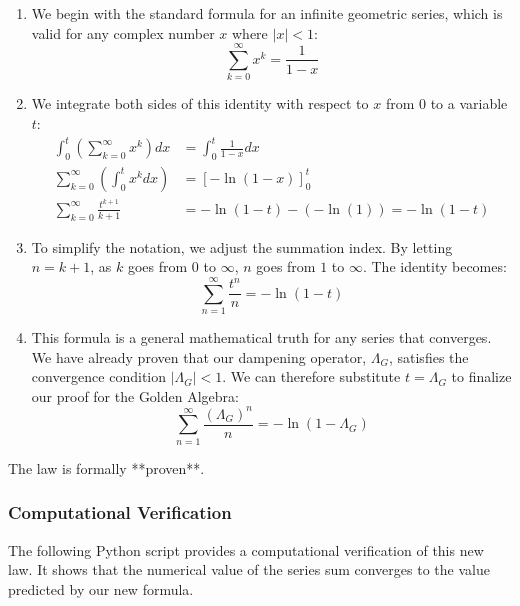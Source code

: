 \begin{enumerate}
    \item We begin with the standard formula for an infinite geometric series, which is valid for any complex number $x$ where $|x| < 1$:
    $$ \sum_{k=0}^{\infty} x^k = \frac{1}{1-x} $$

    \item We integrate both sides of this identity with respect to $x$ from $0$ to a variable $t$:
    \begin{align*}
        \int_0^t \left( \sum_{k=0}^{\infty} x^k \right) dx &= \int_0^t \frac{1}{1-x} dx \\
        \sum_{k=0}^{\infty} \left( \int_0^t x^k dx \right) &= [-\ln(1-x)]_0^t \\
        \sum_{k=0}^{\infty} \frac{t^{k+1}}{k+1} &= -\ln(1-t) - (-\ln(1)) = -\ln(1-t)
    \end{align*}

    \item To simplify the notation, we adjust the summation index. By letting $n = k+1$, as $k$ goes from $0$ to $\infty$, $n$ goes from $1$ to $\infty$. The identity becomes:
    $$ \sum_{n=1}^{\infty} \frac{t^{n}}{n} = -\ln(1-t) $$

    \item This formula is a general mathematical truth for any series that converges. We have already proven that our dampening operator, $\Lambda_G$, satisfies the convergence condition $|\Lambda_G| < 1$. We can therefore substitute $t = \Lambda_G$ to finalize our proof for the Golden Algebra:
    $$ \sum_{n=1}^{\infty} \frac{(\Lambda_G)^n}{n} = -\ln(1-\Lambda_G) $$
\end{enumerate}
The law is formally **proven**.

\subsubsection*{Computational Verification}
The following Python script provides a computational verification of this new law. It shows that the numerical value of the series sum converges to the value predicted by our new formula.

